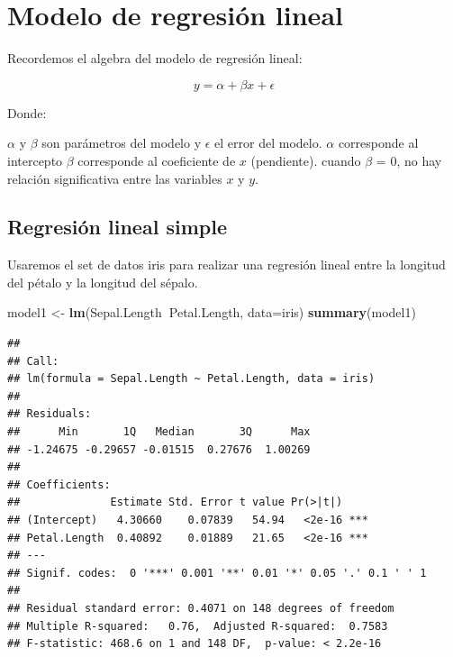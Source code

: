 \documentclass[
]{book}
\newenvironment{Shaded}{\begin{snugshade}}{\end{snugshade}}
\newcommand{\DataTypeTok}[1]{\textcolor[rgb]{0.13,0.29,0.53}{#1}}
\newcommand{\KeywordTok}[1]{\textcolor[rgb]{0.13,0.29,0.53}{\textbf{#1}}}
\newcommand{\NormalTok}[1]{#1}
\newcommand{\OperatorTok}[1]{\textcolor[rgb]{0.81,0.36,0.00}{\textbf{#1}}}
\newcommand{\StringTok}[1]{\textcolor[rgb]{0.31,0.60,0.02}{#1}}
\begin{document}
\hypertarget{modelo-de-regresiuxf3n-lineal}{%
\chapter{Modelo de regresión lineal}\label{modelo-de-regresiuxf3n-lineal}}

Recordemos el algebra del modelo de regresión lineal:

\begin{equation} 
y = \alpha + \beta x + \epsilon
  \label{eq:binom}
\end{equation}

Donde:

\(\alpha\) y \(\beta\) son parámetros del modelo y \(\epsilon\) el error del modelo.
\(\alpha\) corresponde al intercepto
\(\beta\) corresponde al coeficiente de \(x\) (pendiente).
cuando \(\beta\) = 0, no hay relación significativa entre las variables \(x\) y \(y\).

\hypertarget{regresiuxf3n-lineal-simple}{%
\section{Regresión lineal simple}\label{regresiuxf3n-lineal-simple}}

Usaremos el set de datos iris para realizar una regresión lineal entre la longitud del pétalo y la longitud del sépalo.

\begin{Shaded}
\begin{Highlighting}[]
\NormalTok{model1 <-}\StringTok{ }\KeywordTok{lm}\NormalTok{(Sepal.Length}\OperatorTok{~}\NormalTok{Petal.Length, }\DataTypeTok{data=}\NormalTok{iris)}
\KeywordTok{summary}\NormalTok{(model1)}
\end{Highlighting}
\end{Shaded}

\begin{verbatim}
## 
## Call:
## lm(formula = Sepal.Length ~ Petal.Length, data = iris)
## 
## Residuals:
##      Min       1Q   Median       3Q      Max 
## -1.24675 -0.29657 -0.01515  0.27676  1.00269 
## 
## Coefficients:
##              Estimate Std. Error t value Pr(>|t|)    
## (Intercept)   4.30660    0.07839   54.94   <2e-16 ***
## Petal.Length  0.40892    0.01889   21.65   <2e-16 ***
## ---
## Signif. codes:  0 '***' 0.001 '**' 0.01 '*' 0.05 '.' 0.1 ' ' 1
## 
## Residual standard error: 0.4071 on 148 degrees of freedom
## Multiple R-squared:   0.76,  Adjusted R-squared:  0.7583 
## F-statistic: 468.6 on 1 and 148 DF,  p-value: < 2.2e-16
\end{verbatim}
\end{document}
